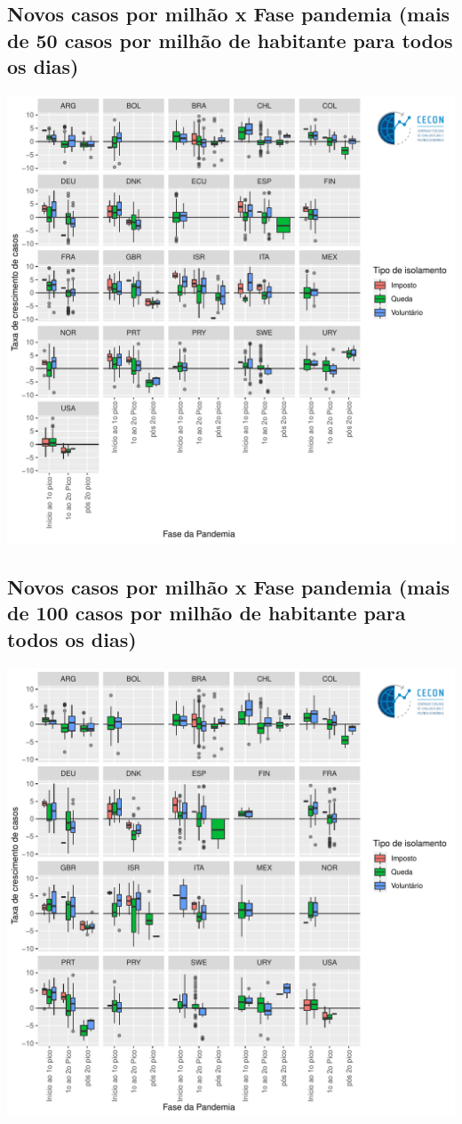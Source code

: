 \documentclass{SelfArx}
\begin{document}
\subsection*{Novos casos por milhão x Fase pandemia (mais de 50 casos por milhão de habitante para todos os dias)}
\label{sec:org20143c8}

\begin{center}
\includegraphics[width=.9\linewidth]{./figs/COVID/Casos_Policy_50_Todos.pdf}
\end{center}

\subsection*{Novos casos por milhão x Fase pandemia (mais de 100 casos por milhão de habitante para todos os dias)}
\label{sec:org0a7cc56}

\begin{center}
\includegraphics[width=.9\linewidth]{./figs/COVID/Casos_Policy_100_Todos.pdf}
\end{center}
\end{document}

